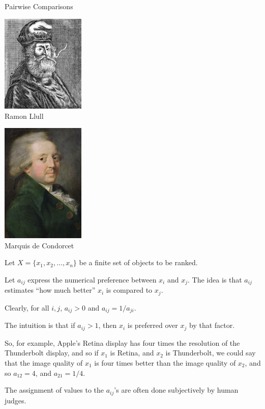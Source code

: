 \begin{frame}
{Pairwise Comparisons}

\begin{center}
\includegraphics[width=4cm]{Figures/llull.jpg} \\
Ramon Llull
\end{center}
\end{frame}

\begin{frame}

\begin{center}
\includegraphics[width=4cm]{Figures/condorcet.png} \\
Marquis de Condorcet
\end{center}
\end{frame}

\begin{frame}
Let $X=\{x_1,x_2,\ldots,x_n\}$ be a finite set of objects to be
ranked.  

Let $a_{ij}$ express the numerical preference between $x_i$
and $x_j$.  
The idea is that $a_{ij}$ estimates ``how much better''
$x_i$ is compared to $x_j$.  

Clearly, for all $i,j$, $a_{ij}>0$ and
$a_{ij}=1/a_{ji}$.  

The intuition is that if $a_{ij}>1$, then $x_i$ is
preferred over $x_j$ by that factor. 

So, for example, Apple's Retina
display has four times the resolution of the Thunderbolt display, and
so if $x_1$ is Retina, and $x_2$ is Thunderbolt, we could say that the
image quality of $x_1$ is four times better than the image quality of
$x_2$, and so $a_{12}=4$, and $a_{21}=1/4$. 

The assignment of values
to the $a_{ij}$'s are often done subjectively by human judges.
\end{frame}

